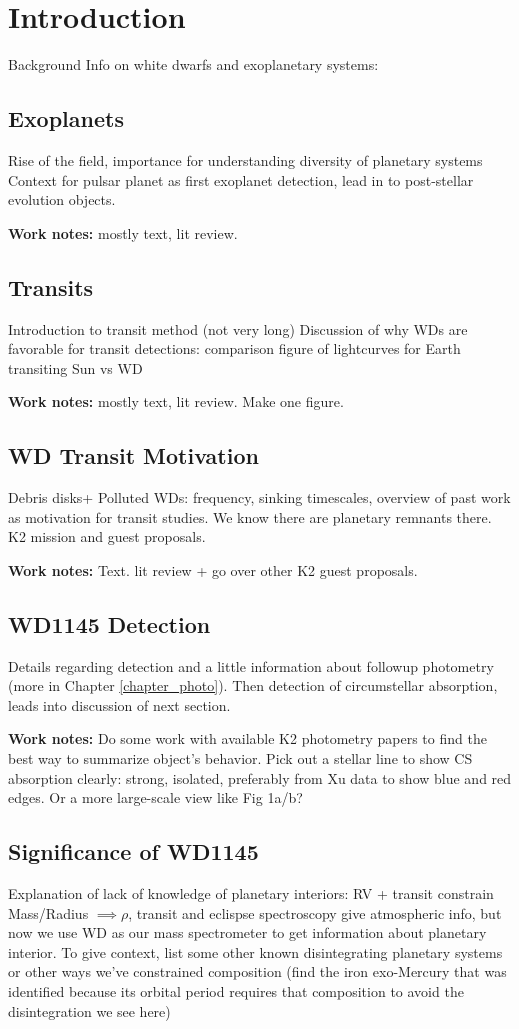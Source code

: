\chapter{Introduction}
\label{intro}

Background Info on white dwarfs and exoplanetary systems:
\section{Exoplanets}
Rise of the field, importance for understanding diversity of planetary systems
Context for pulsar planet as first exoplanet detection, lead in to post-stellar evolution objects. 

\textbf{Work notes:} mostly text, lit review.
\section{Transits}
Introduction to transit method (not very long)
Discussion of why WDs are favorable for transit detections: comparison figure of lightcurves for Earth transiting Sun vs WD

\textbf{Work notes:} mostly text, lit review. Make one figure.
\section{WD Transit Motivation}
Debris disks+ Polluted WDs: frequency, sinking timescales, overview of past work as motivation for transit studies. We know there are planetary remnants there.
K2 mission and guest proposals.

\textbf{Work notes:} Text. lit review +  go over other K2 guest proposals.
\section{WD1145 Detection}
Details regarding detection and a little information about followup photometry (more in Chapter \ref{chapter_photo}). 
Then \cite{Xu2016} detection of circumstellar absorption, leads into discussion of next section.

\textbf{Work notes:} Do some work with available K2 photometry papers to find the best way to summarize object's behavior. Pick out a stellar line to show CS absorption clearly: strong, isolated, preferably from Xu data to show blue and red edges. Or a more large-scale view like \cite{Xu2016} Fig 1a/b?
\section{Significance of WD1145} 
Explanation of lack of knowledge of planetary interiors: RV + transit constrain Mass/Radius $\implies \rho$, transit and eclispse spectroscopy give atmospheric info, but now we use WD as our mass spectrometer to get information about planetary interior. To give context, list some other known disintegrating planetary systems or other ways we've constrained composition (find the iron exo-Mercury that was identified because its orbital period requires that composition to avoid the disintegration we see here)

